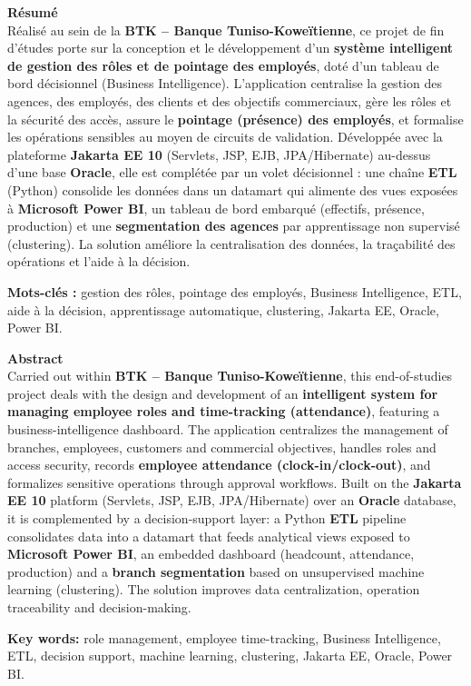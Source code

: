 \thispagestyle{empty}
{
\vspace*{0.8cm}

{\large\bfseries\color{black} Résumé}\\[0.3cm]
\noindent
Réalisé au sein de la \textbf{BTK -- Banque Tuniso-Koweïtienne}, ce projet de fin
d'études porte sur la conception et le développement d'un \textbf{système
intelligent de gestion des rôles et de pointage des employés}, doté d'un tableau
de bord décisionnel (Business Intelligence). L'application centralise la gestion
des agences, des employés, des clients et des objectifs commerciaux, gère les
rôles et la sécurité des accès, assure le \textbf{pointage (présence) des
employés}, et formalise les opérations sensibles au moyen de circuits de
validation. Développée avec la plateforme \textbf{Jakarta EE 10} (Servlets, JSP,
EJB, JPA/Hibernate) au-dessus d'une base \textbf{Oracle}, elle est complétée par
un volet décisionnel : une chaîne \textbf{ETL} (Python) consolide les données dans
un datamart qui alimente des vues exposées à \textbf{Microsoft Power BI}, un
tableau de bord embarqué (effectifs, présence, production) et une
\textbf{segmentation des agences} par apprentissage non supervisé (clustering).
La solution améliore la centralisation des données, la traçabilité des opérations
et l'aide à la décision.

\vspace{0.4cm}
\noindent\textbf{Mots-clés :} gestion des rôles, pointage des employés, Business
Intelligence, ETL, aide à la décision, apprentissage automatique, clustering,
Jakarta EE, Oracle, Power BI.

\vspace{0.75cm}

{\large\bfseries\color{black} Abstract}\\[0.3cm]
\noindent
Carried out within \textbf{BTK -- Banque Tuniso-Koweïtienne}, this end-of-studies
project deals with the design and development of an \textbf{intelligent system for
managing employee roles and time-tracking (attendance)}, featuring a
business-intelligence dashboard. The application centralizes the management of
branches, employees, customers and commercial objectives, handles roles and
access security, records \textbf{employee attendance (clock-in/clock-out)}, and
formalizes sensitive operations through approval workflows. Built on the
\textbf{Jakarta EE 10} platform (Servlets, JSP, EJB, JPA/Hibernate) over an
\textbf{Oracle} database, it is complemented by a decision-support layer: a Python
\textbf{ETL} pipeline consolidates data into a datamart that feeds analytical views
exposed to \textbf{Microsoft Power BI}, an embedded dashboard (headcount,
attendance, production) and a \textbf{branch segmentation} based on unsupervised
machine learning (clustering). The solution improves data centralization,
operation traceability and decision-making.

\vspace{0.4cm}
\noindent\textbf{Key words:} role management, employee time-tracking, Business
Intelligence, ETL, decision support, machine learning, clustering, Jakarta EE,
Oracle, Power BI.
}

\clearpage
